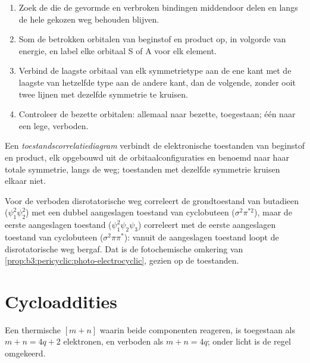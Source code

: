 \begin{method}\label{met:b3:pericyclic:correlation-diagram}
\begin{enumerate}
  \item Zoek de  die de gevormde en verbroken bindingen
        middendoor delen en langs de hele gekozen weg behouden blijven.
  \item Som de betrokken orbitalen van beginstof en product op, in
        volgorde van energie, en label elke orbitaal S of A voor elk
        element.
  \item Verbind de laagste orbitaal van elk symmetrietype aan de ene kant
        met de laagste van hetzelfde type aan de andere kant, dan de
        volgende, zonder ooit twee lijnen met dezelfde symmetrie te
        kruisen.
  \item Controleer de bezette orbitalen: allemaal naar bezette, toegestaan;
        één naar een lege, verboden.
\end{enumerate}
\end{method}

\begin{definition}[Toestandscorrelatiediagram]\label{def:b3:pericyclic:state-correlation}
Een \emph{toestandscorrelatiediagram}
verbindt de elektronische toestanden van beginstof en product, elk
opgebouwd uit de orbitaalconfiguraties en benoemd naar haar totale
symmetrie, langs de weg; toestanden met dezelfde symmetrie kruisen
elkaar niet.
\end{definition}

Voor de verboden disrotatorische weg correleert de grondtoestand van butadieen ($\psi_1^2\psi_2^2$)
met een dubbel aangeslagen toestand van cyclobuteen ($\sigma^2\pi^{*2}$), maar de eerste aangeslagen
toestand ($\psi_1^2\psi_2\psi_3$) correleert met de eerste aangeslagen toestand van cyclobuteen ($\sigma^2\pi\pi^*$): vanuit de
aangeslagen toestand loopt de disrotatorische weg bergaf. Dat is de
fotochemische omkering van \cref{prop:b3:pericyclic:photo-electrocyclic},
gezien op de toestanden.

\section{Cycloaddities}

\begin{theorem}[Cycloaddities]\label{thm:b3:pericyclic:cycloaddition}
Een thermische  $[m + n]$ waarin beide componenten  reageren, is
toegestaan als $m + n = 4q + 2$ elektronen, en verboden als $m + n = 4q$; onder licht is de
regel omgekeerd.
\end{theorem}

